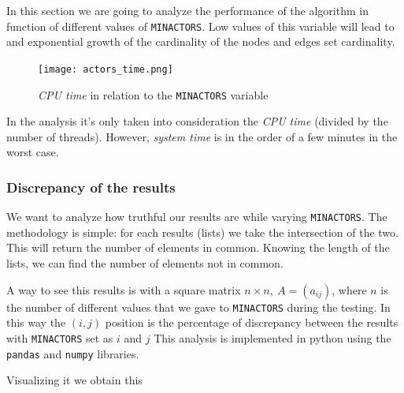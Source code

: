 In this section we are going to analyze the performance of the algorithm in function of different values of \texttt{MIN\textunderscore ACTORS}. Low values of this variable will lead to and exponential growth of the cardinality of the nodes and edges set cardinality.
\newpage

\begin{figure}[h!]
    \centering
    \texttt{[image: actors\_time.png]}
    \caption{\emph{CPU time} in relation to the \texttt{MIN\textunderscore ACTORS} variable}
\end{figure}

\nd In the analysis it's only taken into consideration the \emph{CPU time} (divided by the number of threads). However, \emph{system time} is in the order of a few minutes in the worst case.



\subsubsection{Discrepancy of the results}
We want to analyze how truthful our results are while varying \texttt{MIN\textunderscore ACTORS}. The methodology is simple: for each results (lists) we take the intersection of the two. This will return the number of elements in common. Knowing the length of the lists, we can find the number of elements not in common. \s

\nd A way to see this results is with a square matrix $n \times n, ~ A = (a_{ij})$, where $n$ is the number of different values that we gave to \texttt{MIN\textunderscore ACTORS} during the testing. In this way the $(i,j)$ position is the percentage of discrepancy between the results with \texttt{MIN\textunderscore ACTORS} set as $i$ and $j$ \s
\newpage
\nd This analysis is implemented in python using the \texttt{pandas} and \texttt{numpy} libraries.



\nd Visualizing it we obtain this


